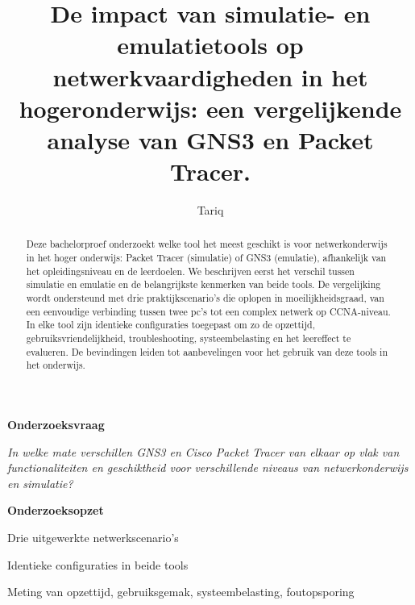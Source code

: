 \documentclass[a0,portrait]{hogent-poster}
\title{De impact van simulatie- en emulatietools op netwerkvaardigheden in het hogeronderwijs: een vergelijkende analyse van GNS3 en Packet Tracer.}
\author{Tariq}
\begin{document}
\maketitle


\vspace{0.3cm}

\noindent\textbf{\LARGE Onderzoeksvraag}

\vspace{0.3cm}

\noindent
\textit{In welke mate verschillen GNS3 en Cisco Packet Tracer van elkaar op vlak van functionaliteiten en geschiktheid voor verschillende niveaus van netwerkonderwijs en simulatie?}

\vspace{0.3cm}

\noindent\textbf{\LARGE Onderzoeksopzet}

\vspace{0.3cm}

\noindent



\begin{minipage}[t]{0.32\textwidth}
     Drie uitgewerkte netwerkscenario's
\end{minipage}
\begin{minipage}[t]{0.32\textwidth}
    Identieke configuraties in beide tools
\end{minipage}
\begin{minipage}[t]{0.32\textwidth}
    Meting van opzettijd, gebruiksgemak, systeembelasting, foutopsporing
\end{minipage}


\vspace{0.3cm}

\begin{abstract}
 Deze bachelorproef onderzoekt welke tool het meest geschikt is voor netwerkonderwijs in het hoger onderwijs: Packet Tracer (simulatie) of GNS3 (emulatie), afhankelijk van het opleidingsniveau en de leerdoelen. We beschrijven eerst het verschil tussen simulatie en emulatie en de belangrijkste kenmerken van beide tools. De vergelijking wordt ondersteund met drie praktijkscenario’s die oplopen in moeilijkheidsgraad, van een eenvoudige verbinding tussen twee pc’s tot een complex netwerk op CCNA-niveau. In elke tool zijn identieke configuraties toegepast om zo de opzettijd, gebruiksvriendelijkheid, troubleshooting, systeembelasting en het leereffect te evalueren. De bevindingen leiden tot aanbevelingen voor het gebruik van deze tools in het onderwijs.


\end{abstract}
\end{document}
